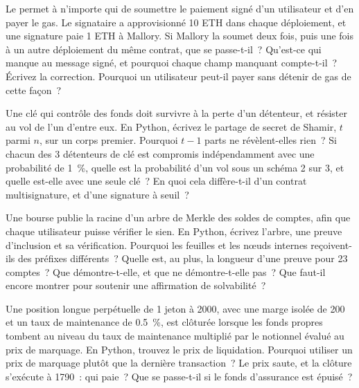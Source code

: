 \begin{question}\label{iq:iv3:smart-contracts-and-crypto-engineering:24}
Le  permet à n'importe qui de soumettre le paiement signé d'un utilisateur et d'en payer le gas. Le signataire a approvisionné 10 ETH dans chaque déploiement, et une signature paie 1 ETH à Mallory. Si Mallory la soumet deux fois, puis une fois à un autre déploiement du même contrat, que se passe-t-il~? Qu'est-ce qui manque au message signé, et pourquoi chaque champ manquant compte-t-il~? Écrivez la correction. Pourquoi un utilisateur peut-il payer sans détenir de gas de cette façon~?
\label{lst:iv3:cr:relay}
\end{question}

\begin{question}\label{iq:iv3:smart-contracts-and-crypto-engineering:25}
Une clé qui contrôle des fonds doit survivre à la perte d'un détenteur, et résister au vol de l'un d'entre eux. En Python, écrivez le partage de secret de Shamir, $t$ parmi $n$, sur un corps premier. Pourquoi $t - 1$ parts ne révèlent-elles rien~? Si chacun des 3 détenteurs de clé est compromis indépendamment avec une probabilité de 1~\%, quelle est la probabilité d'un vol sous un schéma 2 sur 3, et quelle est-elle avec une seule clé~? En quoi cela diffère-t-il d'un contrat multisignature, et d'une signature à seuil~?
\end{question}

\begin{question}\label{iq:iv3:smart-contracts-and-crypto-engineering:26}
Une bourse publie la racine d'un arbre de Merkle des soldes de comptes, afin que chaque utilisateur puisse vérifier le sien. En Python, écrivez l'arbre, une preuve d'inclusion et sa vérification. Pourquoi les feuilles et les nœuds internes reçoivent-ils des préfixes différents~? Quelle est, au plus, la longueur d'une preuve pour 23 comptes~? Que démontre-t-elle, et que ne démontre-t-elle pas~? Que faut-il encore montrer pour soutenir une affirmation de solvabilité~?
\end{question}

\begin{question}\label{iq:iv3:smart-contracts-and-crypto-engineering:27}
Une position longue perpétuelle de 1 jeton à 2000, avec une marge isolée de 200 et un taux de maintenance de 0.5~\%, est clôturée lorsque les fonds propres tombent au niveau du taux de maintenance multiplié par le notionnel évalué au prix de marquage. En Python, trouvez le prix de liquidation. Pourquoi utiliser un prix de marquage plutôt que la dernière transaction~? Le prix saute, et la clôture s'exécute à 1790~: qui paie~? Que se passe-t-il si le fonds d'assurance est épuisé~?
\end{question}

